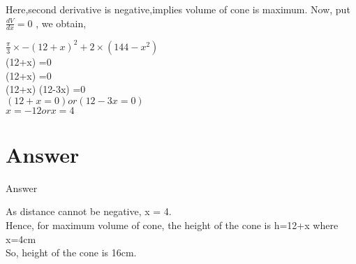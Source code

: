 \documentclass{beamer}
\begin{document}
\begin{frame}
                 
Here,second derivative is negative,implies volume of cone is maximum.
Now, put $\frac{dV}{dx} =0$ , we obtain,

$\frac{\pi}{3} \times{-(12+x)^2+2\times(144-x^2)}$\\
\implies (12+x)  =0\\
\implies (12+x) =0\\
\implies (12+x) \times (12-3x) =0\\
\implies$(12+x =0)     or    (12-3x =0)$\\
\implies $x = -12     or    x = 4$\\

\end{frame}
	\section{Answer}
	\begin{frame}{Answer}
	

	As distance cannot be negative, x = 4.\\
Hence, for maximum volume of cone, the height of the cone is h=12+x where x=4cm\\
So, height of the cone is 16cm.\\


\end{frame}
\end{document}
